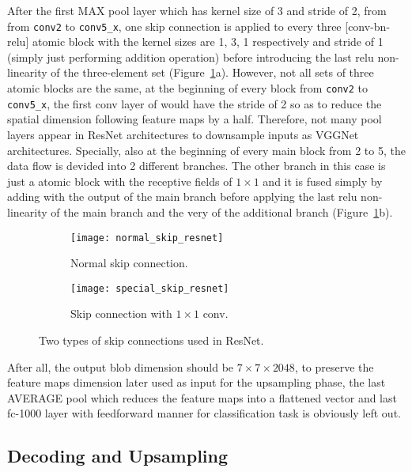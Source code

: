 After the first MAX \acrshort{pool} layer which has kernel size of 3 and stride
of 2, from from \texttt{conv2} to \texttt{conv5\_x}, one skip connection is
applied to every three [\acrshort{conv}-\acrshort{bn}-\acrshort{relu}] atomic
block with the kernel sizes are 1, 3, 1 respectively and stride of 1 (simply
just performing addition operation) before introducing the last \acrshort{relu}
non-linearity of the three-element set (Figure~\ref{fig:2skips}a). However, not
all sets of three atomic blocks are the same, at the beginning of every block
from \texttt{conv2} to \texttt{conv5\_x}, the first \acrshort{conv} layer of
would have the stride of 2 so as to reduce the spatial dimension following
feature maps by a half. Therefore, not many \acrshort{pool} layers appear in
ResNet architectures to downsample inputs as VGGNet architectures. Specially,
also at the beginning of every main block from 2 to 5, the data flow is devided
into 2 different branches. The other branch in this case is just a atomic block
with the receptive fields of $1 \times 1$ and it is fused simply by adding with
the output of the main branch before applying the last \acrshort{relu}
non-linearity of the main branch and the very of the additional branch
(Figure~\ref{fig:2skips}b).
\begin{figure}[h]
    \centering
    \begin{subfigure}[b]{\linewidth}
        \texttt{[image: normal\_skip\_resnet]}
        \caption{Normal skip connection.}
    \end{subfigure}
    \begin{subfigure}[b]{\linewidth}
        \texttt{[image: special\_skip\_resnet]}
        \caption{Skip connection with $1 \times 1$ \acrshort{conv}.}
    \end{subfigure}
    \caption{Two types of skip connections used in ResNet.}
    \label{fig:2skips}
\end{figure}

After all, the output blob dimension should be $7 \times 7 \times 2048$, to
preserve the feature maps dimension later used as input for the upsampling
phase, the last AVERAGE \acrshort{pool} which reduces the feature maps into a
flattened vector and last \acrshort{fc}-1000 layer with feedforward manner for
classification task is obviously left out.

\subsection{Decoding and Upsampling}
